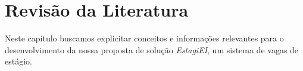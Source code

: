 \chapter{Revisão da Literatura}
Neste capítulo buscamos explicitar conceitos e informações relevantes para o desenvolvimento da nossa proposta de solução \emph{EstagiEI}, um sistema de vagas de estágio.






